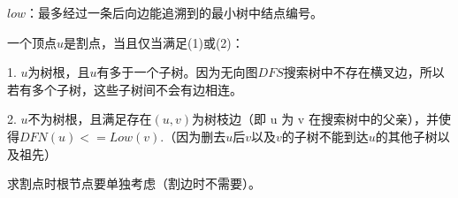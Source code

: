 $low$：最多经过一条后向边能追溯到的最小树中结点编号。

一个顶点$ u $是割点，当且仅当满足(1)或(2)：

1. $u $为树根，且$ u $有多于一个子树。因为无向图$ DFS $搜索树中不存在横叉边，所以若有多个子树，这些子树间不会有边相连。

2. $u $不为树根，且满足存在$(u,v)$为树枝边（即 u 为 v 在搜索树中的父亲），并使得$DFN(u)<=Low(v)$.（因为删去$u$后$v$以及$ v $的子树不能到达$ u $的其他子树以及祖先）

求割点时根节点要单独考虑（割边时不需要）。